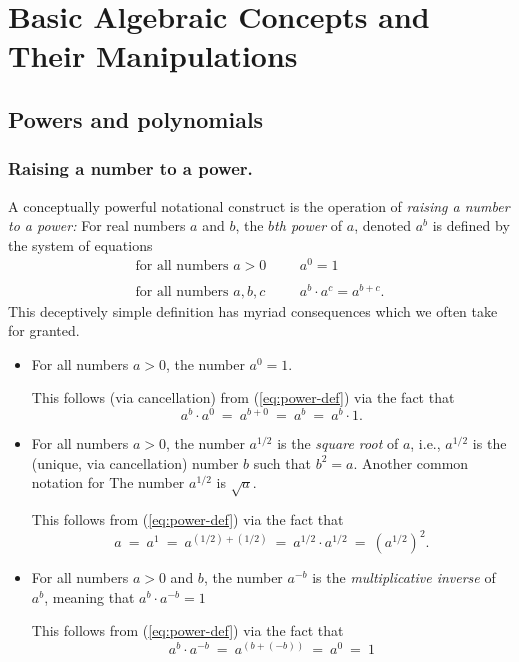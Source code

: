 \section{Basic Algebraic Concepts and Their Manipulations}

\subsection{Powers and polynomials}
\label{sec:powers+polynolmials}

\subsubsection{Raising a number to a power.}
\label{sec:x-toa-power}
A conceptually powerful notational construct is the operation of {\it
  raising a number to a power:}
%
For real numbers $a$ and $b$, the {\it $b$th power} of $a$, denoted
$a^b$ is defined by the system of equations
\begin{equation}
\label{eq:power-def}
\begin{array}{llll}
\mbox{for all numbers $a>0$} & & & a^0 = 1 \\
 & & & \\
\mbox{for all numbers $a, b, c$} & & & a^b \cdot a^c = a^{b+c}.
\end{array}
\end{equation}
This deceptively simple definition has myriad consequences which we
often take for granted.
\begin{itemize}
\item
For all numbers $a>0$, the number $a^0 = 1$.

This follows (via cancellation) from (\ref{eq:power-def}) via the fact
that
\[ a^b \cdot a^0 \ = \ a^{b+0} \ = \ a^b \ = \ a^b \cdot 1.  \]

\item
For all numbers $a >0$, the number $a^{1/2}$
is the {\it square root} of $a$,
i.e., $a^{1/2}$ is the (unique, via cancellation) number $b$ such that
$b^2 = a$.  Another common notation for The number $a^{1/2}$ is
$\sqrt{a}$.

This follows from (\ref{eq:power-def}) via the fact that
\[ a \ = \ a^1 \ = \ a^{(1/2) + (1/2)} \ = \ a^{1/2} \cdot a^{1/2} \ = \
\left(a^{1/2}\right)^2. \]

\item
For all numbers $a>0$ and $b$, the number $a^{-b}$ is the {\it
  multiplicative inverse}
of $a^b$, meaning that $a^b \cdot a^{-b} = 1$

This follows from (\ref{eq:power-def}) via the fact that
\[ a^b \cdot a^{-b} \ = \ a^{(b + (-b))} \ = \ a^0 \ = \  1 \]
\end{itemize}
